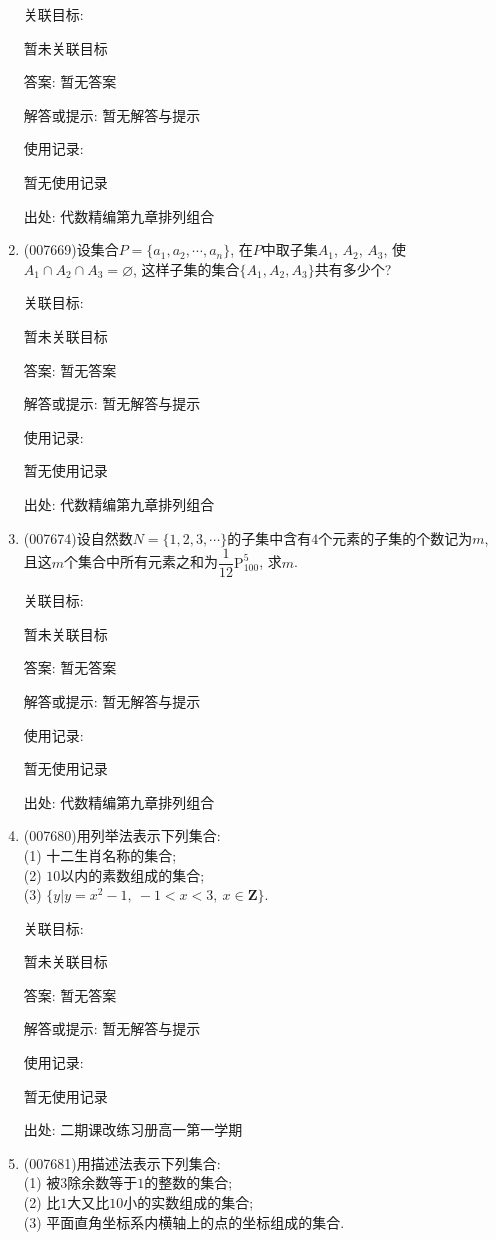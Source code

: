 \documentclass[10pt,a4paper]{article}
\begin{document}
\begin{enumerate}[1.]
关联目标:

暂未关联目标

答案: 暂无答案

解答或提示: 暂无解答与提示

使用记录:

暂无使用记录


出处: 代数精编第九章排列组合
\item { (007669)}设集合$P=\{a_1,a_2,\cdots ,a_n\}$, 在$P$中取子集$A_1$, $A_2$, $A_3$, 使$A_1\cap A_2\cap A_3=\varnothing$, 这样子集的集合$\{A_1,A_2,A_3\}$共有多少个?


关联目标:

暂未关联目标

答案: 暂无答案

解答或提示: 暂无解答与提示

使用记录:

暂无使用记录


出处: 代数精编第九章排列组合
\item { (007674)}设自然数$N=\{1,2,3,\cdots\}$的子集中含有$4$个元素的子集的个数记为$m$, 且这$m$个集合中所有元素之和为$\dfrac 1{12}\mathrm{P}_{100}^5$, 求$m$.


关联目标:

暂未关联目标

答案: 暂无答案

解答或提示: 暂无解答与提示

使用记录:

暂无使用记录


出处: 代数精编第九章排列组合
\item { (007680)}用列举法表示下列集合:\\
(1) 十二生肖名称的集合;\\
(2) $10$以内的素数组成的集合;\\
(3) $\{y|y=x^2-1, \ -1<x<3, \ x\in \mathbf{Z}\}$.


关联目标:

暂未关联目标

答案: 暂无答案

解答或提示: 暂无解答与提示

使用记录:

暂无使用记录


出处: 二期课改练习册高一第一学期
\item { (007681)}用描述法表示下列集合:\\
(1) 被$3$除余数等于$1$的整数的集合;\\
(2) 比$1$大又比$10$小的实数组成的集合;\\
(3) 平面直角坐标系内横轴上的点的坐标组成的集合.



\end{enumerate}
\end{document}
